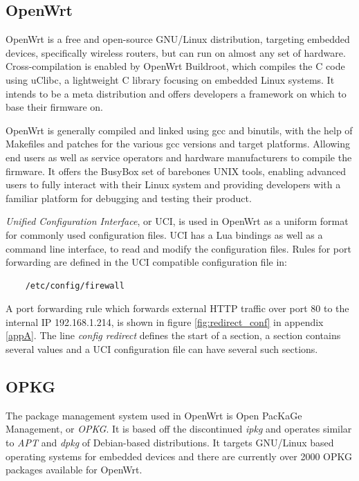 \documentclass[a4paper,11pt,makeidx]{kth-bcs}
\begin{document}
\subsection{OpenWrt}
OpenWrt is a free and open-source GNU/Linux distribution, targeting embedded devices, specifically wireless routers, but can run on almost any set of hardware.
Cross-compilation is enabled by OpenWrt Buildroot, which compiles the C code using uClibc, a lightweight C library focusing on embedded Linux systems. 
It intends to be a meta distribution and offers developers a framework on which to base their firmware on.

OpenWrt is generally compiled and linked using gcc and binutils, with the help of Makefiles and patches for the various gcc versions and target platforms.
Allowing end users as well as service operators and hardware manufacturers to compile the firmware.
It offers the BusyBox set of barebones UNIX tools, enabling advanced users to fully interact with their Linux system and providing developers with a familiar platform for debugging and testing their product.\cite{OpenWrt:structure_design}

\emph{Unified Configuration Interface}, or UCI, is used in OpenWrt as a uniform format for commonly used configuration files.
UCI has a Lua bindings as well as a command line interface, to read and modify the configuration files.
Rules for port forwarding are defined in the UCI compatible configuration file in:
\begin{verbatim}
    /etc/config/firewall
\end{verbatim}

A port forwarding rule which forwards external HTTP traffic over port 80 to the internal IP 192.168.1.214, is shown in figure \ref{fig:redirect_conf} in appendix \ref{appA}.
The line \emph{config redirect} defines the start of a section, a section contains several values and a UCI configuration file can have several such sections.

\subsection{OPKG}
The package management system used in OpenWrt is Open PacKaGe Management, or \emph{OPKG}. It is based off the discontinued \emph{ipkg} and operates similar to \emph{APT} and \emph{dpkg} of Debian-based distributions.
It targets GNU/Linux based operating systems for embedded devices and there are currently over 2000 OPKG packages available for OpenWrt.
\end{document}
